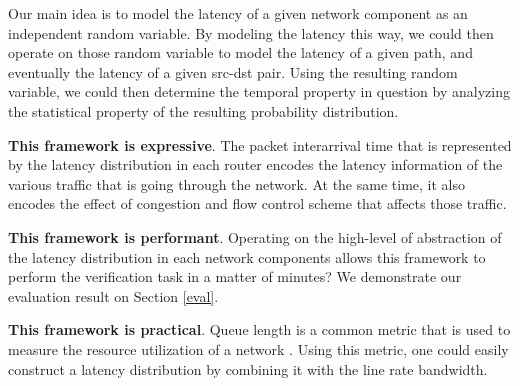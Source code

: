 Our main idea is to model the latency of a given network component as an independent random variable.
By modeling the latency this way, we could then operate on those random variable to model the latency 
of a given path, and eventually the latency of a given src-dst pair.
Using the resulting random variable, we could then determine the temporal property in question by 
analyzing the statistical property of the resulting probability distribution.

\textbf{This framework is expressive}.
The packet interarrival time that is represented by the latency distribution in each router encodes the 
latency information of the various traffic that is going through the network.
At the same time, it also encodes the effect of congestion and flow control scheme that affects 
those traffic.

\textbf{This framework is performant}.
Operating on the high-level of abstraction of the latency distribution in each network components allows 
this framework to perform the verification task in a matter of minutes?
We demonstrate our evaluation result on Section \ref{eval}.

\textbf{This framework is practical}.
Queue length is a common metric that is used to measure the resource utilization of a network 
\cite{dctcp} \cite{swift}.
Using this metric, one could easily construct a latency distribution by combining it with the 
line rate bandwidth.



